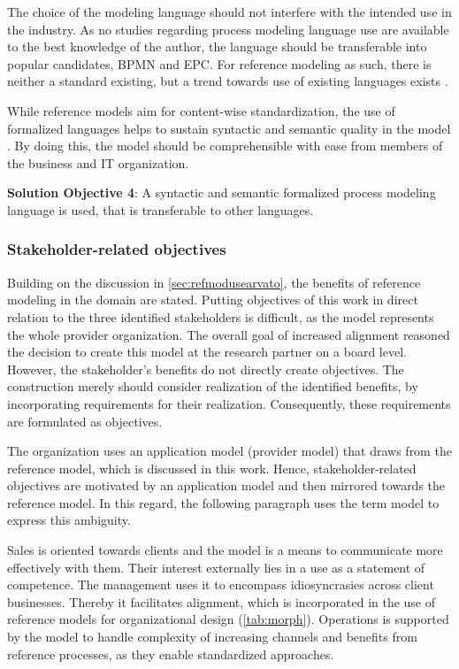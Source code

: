 The choice of the modeling language should not interfere with the intended use in the industry. As no studies regarding process modeling language use are available to the best knowledge of the author, the language should be transferable into popular candidates, \eg \acrshort{BPMN} and \acrshort{EPC}. For reference modeling as such, there is neither a standard existing, but a trend towards use of existing languages exists \citep{Fettke2004}. 

While reference models aim for content-wise standardization, the use of formalized languages helps to sustain syntactic and semantic quality in the model \citep{Fettke2004}. By doing this, the model should be comprehensible with ease from members of the business and IT organization. 

\hfill\begin{minipage}{\dimexpr\textwidth-1.2cm}
	\textbf{Solution Objective 4}: A syntactic and semantic formalized process modeling language is used, that is transferable to other languages. 
	
\end{minipage}

\subsubsection{Stakeholder-related objectives}

Building on the discussion in \ref{sec:refmodusearvato}, the benefits of reference modeling in the domain are stated. Putting objectives of this work in direct relation to the three identified stakeholders is difficult, as the model represents the whole provider organization. The overall goal of increased alignment reasoned the decision to create this model at the research partner on a board level. However, the stakeholder's benefits do not directly create objectives. The construction merely should consider realization of the identified benefits, by incorporating requirements for their realization.  Consequently, these requirements are formulated as objectives.  

The organization uses an application model (provider model) that draws from the reference model, which is discussed in this work. Hence, stakeholder-related objectives are motivated by an application model and then mirrored towards the reference model. In this regard, the following paragraph uses the term model to express this ambiguity. 

Sales is oriented towards clients and the model is a means to communicate more effectively with them. Their interest externally lies in a use as a statement of competence. The management uses it to encompass idiosyncrasies across client businesses. Thereby it facilitates alignment, which is incorporated in the use of reference models for organizational design (\cf \Tab \ref{tab:morph}). Operations is supported by the model to handle complexity of increasing channels and benefits from reference processes, as they enable standardized approaches. \todo{+++}
\\

